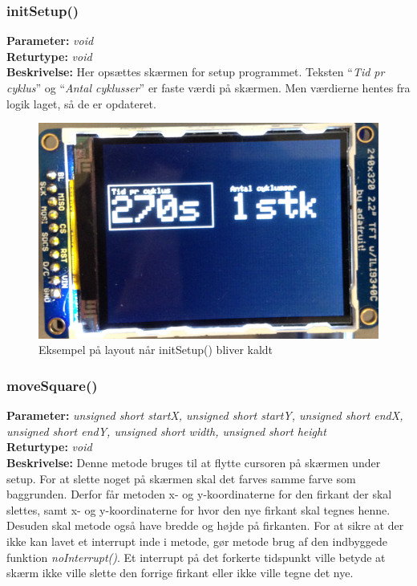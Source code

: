 \subsubsection{initSetup()}
\textbf{Parameter: } \textit{void}
\\ \textbf{Returtype: } \textit{void}
\\ \textbf{Beskrivelse: } Her opsættes skærmen for setup programmet. Teksten “\textit{Tid pr cyklus}” og “\textit{Antal cyklusser}” er faste værdi på skærmen. Men værdierne hentes fra logik laget, så de er opdateret. 

\begin{figure}[H]
	\includegraphics[width=\textwidth]{billeder/setup.png}
	\caption{Eksempel på layout når initSetup() bliver kaldt}\label{pic:setup}
\end{figure}

\subsubsection{moveSquare()}
\textbf{Parameter: } \textit{unsigned short startX, unsigned short startY, unsigned short endX, unsigned short endY, unsigned short width, unsigned short height}
\\ \textbf{Returtype: } \textit{void}
\\ \textbf{Beskrivelse: } Denne metode bruges til at flytte cursoren på skærmen under setup. For at slette noget på skærmen skal det farves samme farve som baggrunden. Derfor får metoden  x- og y-koordinaterne for den firkant der skal slettes, samt x- og y-koordinaterne for hvor den nye firkant skal tegnes henne. Desuden skal metode også have bredde og højde på firkanten. For at sikre at der ikke kan lavet et interrupt inde i metode, gør metode brug af den indbyggede funktion \textit{noInterrupt()}. Et interrupt på det forkerte tidspunkt ville betyde at skærm ikke ville slette den forrige firkant eller ikke ville tegne det nye. 

